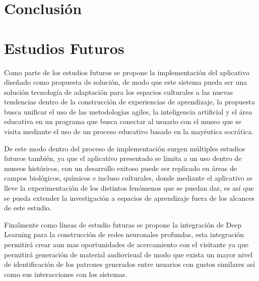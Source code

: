 \documentclass[pdflatex,sn-mathphys-num]{sn-jnl}%
\theoremstyle{thmstyleone}%
\theoremstyle{thmstyletwo}%
\theoremstyle{thmstylethree}%
\begin{document}
\section{Conclusión}\label{sec13}








\section{Estudios Futuros}\label{secA1}
Como parte de los estudios futuros se propone la implementación del aplicativo diseñado como propuesta de solución, de modo que este sistema pueda ser una solución tecnología de adaptación para los espacios culturales a las nuevas tendencias dentro de la construcción de experiencias de aprendizaje, la propuesta busca unificar el uso de las metodologías agiles, la inteligencia artificial y el área educativa en un programa que busca conectar al usuario con el museo que se visita mediante el uso de un proceso educativo basado en la mayéutica socrática.

De este modo dentro del proceso de implementación surgen múltiples estudios futuros también, ya que el aplicativo presentado se limita a un uso dentro de museos históricos, con un desarrollo exitoso puede ser replicado en áreas de campos biológicos, químicos e incluso culturales, donde mediante el aplicativo se lleve la experimentación de los distintos fenómenos que se puedan dar, es así que se pueda extender la investigación a espacios de aprendizaje fuera de los alcances de este estudio.

Finalmente como líneas de estudio futuras se propone la integración de Deep Learning para la construcción de redes neuronales profundas, esta integración permitirá crear aun mas oportunidades de acercamiento con el visitante ya que permitirá generación de material audiovisual de modo que exista un mayor nivel de identificación de los patrones generados entre usuarios con gustos similares así como sus interacciones con los sistemas.




\end{document}
